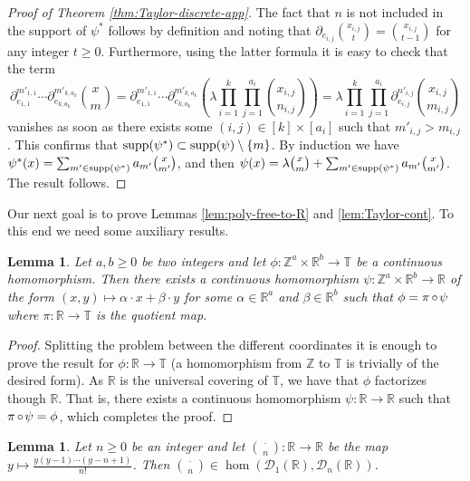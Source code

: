 \documentclass[a4paper,12pt,reqno]{amsart}
\newtheorem{lemma}[theorem]{Lemma}
\theoremstyle{definition}
\def\supp{{\rm supp}}
\def\to{\rightarrow}
\newcommand{\mc}{\mathcal}
\newcommand{\mb}{\mathbb}
\DeclareMathOperator{\co}{\circ\hspace{-0.02 cm}}
\begin{document}
\begin{proof}[Proof of Theorem \ref{thm:Taylor-discrete-app}]
The fact that $n$ is not included in the support of $\psi^*$ follows by definition and noting that $\partial_{e_{i,j}} \binom{x_{i,j}}{t} = \binom{x_{i,j}}{t-1}$ for any integer $t\ge 0$. Furthermore, using the latter formula it is easy to check that the term
\[
\partial_{e_{1,1}}^{m'_{1,1}}\cdots \partial_{e_{k,a_k}}^{m'_{k,a_k}}\binom{x}{m}=\partial_{e_{1,1}}^{m'_{1,1}}\cdots \partial_{e_{k,a_k}}^{m'_{k,a_k}}\left(\lambda\prod_{i=1}^k\prod_{j=1}^{a_i} \binom{x_{i,j}}{n_{i,j}}\right) = \lambda\prod_{i=1}^k\prod_{j=1}^{a_i}\partial_{e_{i,j}}^{n'_{i,j}}\binom{x_{i,j}}{m_{i,j}}
\]
vanishes as soon as there exists some $(i,j)\in [k]\times [a_i]$ such that $m'_{i,j}>m_{i,j}$. This confirms that $\supp(\psi^*)\subset \supp(\psi)\setminus \{m\}$. By induction we have $\psi^*(x)=\sum_{m'\in \supp(\psi^*)}a_{m'} \binom{x}{m'}$, and then $\psi(x) =\lambda\binom{x}{m}+ \sum_{m'\in \supp(\psi^*)}a_{m'} \binom{x}{m'}$. The result follows.
\end{proof}
Our next goal is to prove Lemmas \ref{lem:poly-free-to-R} and \ref{lem:Taylor-cont}. To this end we need some auxiliary results.

\begin{lemma}\label{lem:fact-hom}
Let $a,b\ge 0$ be two integers and let $\phi:\mb{Z}^a\times \mb{R}^b\to \mb{T}$ be a continuous homomorphism. Then there exists a continuous homomorphism $\psi:\mb{Z}^a\times \mb{R}^b\to \mb{R}$ of the form $(x,y)\mapsto \alpha\cdot x+\beta\cdot y$ for some $\alpha\in\mb{R}^a$ and $\beta\in \mb{R}^b$ such that $\phi = \pi\co \psi$ where $\pi:\mb{R}\to \mb{T}$ is the quotient map.
\end{lemma}

\begin{proof}
Splitting the problem between the different coordinates it is enough to prove the result for $\phi:\mb{R}\to \mb{T}$ (a homomorphism from $\mb{Z}$ to $\mb{T}$ is trivially of the desired form). As $\mb{R}$ is the universal covering of $\mb{T}$, we have that $\phi$ factorizes though $\mb{R}$. That is, there exists a continuous homomorphism $\psi:\mb{R}\to \mb{R}$ such that $\pi\co\psi = \phi$, which completes the proof.
\end{proof}

\begin{lemma}\label{lem:poly-cont}
Let $n\ge 0$ be an integer and let $\binom{\cdot}{n}:\mb{R}\to \mb{R}$ be the map $y\mapsto \frac{y(y-1)\cdots(y-n+1)}{n!}$. Then $\binom{\cdot}{n}\in \hom(\mc{D}_1(\mb{R}),\mc{D}_n(\mb{R}))$.
\end{lemma}
\end{document}

